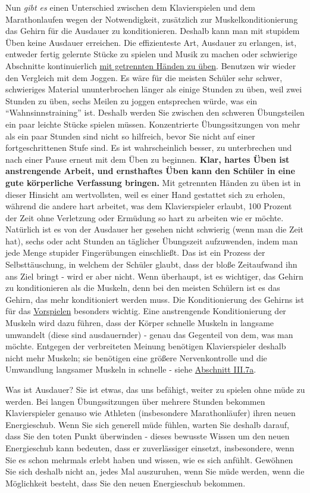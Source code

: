 Nun \textit{gibt es} einen Unterschied zwischen dem Klavierspielen und dem Marathonlaufen wegen der Notwendigkeit, zusätzlich zur Muskelkonditionierung das Gehirn für die Ausdauer zu konditionieren.
Deshalb kann man mit stupidem Üben keine Ausdauer erreichen.
Die effizienteste Art, Ausdauer zu erlangen, ist, entweder fertig gelernte Stücke zu spielen und Musik zu machen oder schwierige Abschnitte kontinuierlich \hyperlink{c1ii7}{mit getrennten Händen zu üben}.
Benutzen wir wieder den Vergleich mit dem Joggen.
Es wäre für die meisten Schüler sehr schwer, schwieriges Material ununterbrochen länger als einige Stunden zu üben, weil zwei Stunden zu üben, sechs Meilen zu joggen entsprechen würde, was ein \enquote{Wahnsinnstraining} ist.
Deshalb werden Sie zwischen den schweren Übungsteilen ein paar leichte Stücke spielen müssen.
Konzentrierte Übungssitzungen von mehr als ein paar Stunden sind nicht so hilfreich, bevor Sie nicht auf einer fortgeschrittenen Stufe sind.
Es ist wahrscheinlich besser, zu unterbrechen und nach einer Pause erneut mit dem Üben zu beginnen.
\textbf{Klar, hartes Üben ist anstrengende Arbeit, und ernsthaftes Üben kann den Schüler in eine gute körperliche Verfassung bringen.}
Mit getrennten Händen zu üben ist in dieser Hinsicht am wertvollsten, weil es einer Hand gestattet sich zu erholen, während die andere hart arbeitet, was dem Klavierspieler erlaubt, 100 Prozent der Zeit ohne Verletzung oder Ermüdung so hart zu arbeiten wie er möchte.
Natürlich ist es von der Ausdauer her gesehen nicht schwierig (wenn man die Zeit hat), sechs oder acht Stunden an täglicher Übungszeit aufzuwenden, indem man jede Menge stupider Fingerübungen einschließt.
Das ist ein Prozess der Selbsttäuschung, in welchem der Schüler glaubt, dass der bloße Zeitaufwand ihn ans Ziel bringt - wird er aber nicht.
Wenn überhaupt, ist es wichtiger, das Gehirn zu konditionieren als die Muskeln, denn bei den meisten Schülern ist es das Gehirn, das mehr konditioniert werden muss.
Die Konditionierung des Gehirns ist für das \hyperlink{c1iii14}{Vorspielen} besonders wichtig.
Eine anstrengende Konditionierung der Muskeln wird dazu führen, dass der Körper schnelle Muskeln in langsame umwandelt (diese sind ausdauernder) - genau das Gegenteil von dem, was man möchte.
Entgegen der verbreiteten Meinung benötigen Klavierspieler deshalb nicht mehr Muskeln; sie benötigen eine größere Nervenkontrolle und die Umwandlung langsamer Muskeln in schnelle - siehe \hyperlink{c1iii7aMuskeln}{Abschnitt III.7a}.

Was ist Ausdauer? Sie ist etwas, das uns befähigt, weiter zu spielen ohne müde zu werden.
Bei langen Übungssitzungen über mehrere Stunden bekommen Klavierspieler genauso wie Athleten (insbesondere Marathonläufer) ihren neuen Energieschub.
Wenn Sie sich generell müde fühlen, warten Sie deshalb darauf, dass Sie den toten Punkt überwinden - dieses bewusste Wissen um den neuen Energieschub kann bedeuten, dass er zuverlässiger einsetzt, insbesondere, wenn Sie es schon mehrmals erlebt haben und wissen, wie es sich anfühlt.
Gewöhnen Sie sich deshalb nicht an, jedes Mal auszuruhen, wenn Sie müde werden, wenn die Möglichkeit besteht, dass Sie den neuen Energieschub bekommen.

